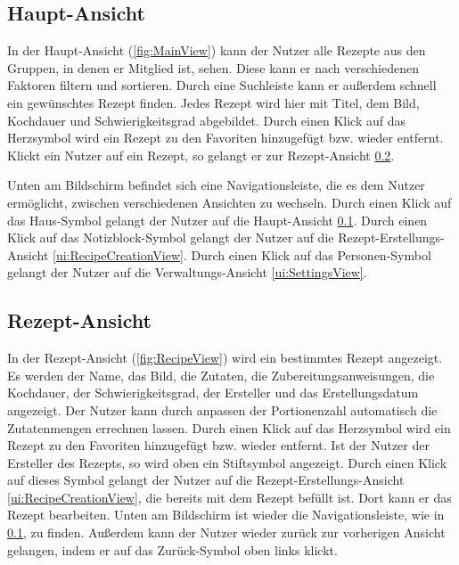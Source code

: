 \documentclass[parskip=full]{scrartcl}
\begin{document}
\subsection{Haupt-Ansicht}
\label{ui:MainView}
In der Haupt-Ansicht (\autoref{fig:MainView}) kann der Nutzer alle Rezepte aus den Gruppen, in denen er Mitglied ist, sehen. Diese kann er nach verschiedenen Faktoren filtern und sortieren. Durch eine Suchleiste kann er außerdem schnell ein gewünschtes Rezept finden. Jedes Rezept wird hier mit Titel, dem Bild, Kochdauer und Schwierigkeitsgrad abgebildet. Durch einen Klick auf das Herzsymbol wird ein Rezept zu den Favoriten hinzugefügt bzw. wieder entfernt. Klickt ein Nutzer auf ein Rezept, so gelangt er zur Rezept-Ansicht \ref{ui:RecipeView}.

Unten am Bildschirm befindet sich eine Navigationsleiste, die es dem Nutzer ermöglicht, zwischen verschiedenen Ansichten zu wechseln. Durch einen Klick auf das Haus-Symbol gelangt der Nutzer auf die Haupt-Ansicht \ref{ui:MainView}. Durch einen Klick auf das Notizblock-Symbol gelangt der Nutzer auf die Rezept-Erstellungs-Ansicht \ref{ui:RecipeCreationView}. Durch einen Klick auf das Personen-Symbol gelangt der Nutzer auf die Verwaltungs-Ansicht \ref{ui:SettingsView}.

\subsection{Rezept-Ansicht}
\label{ui:RecipeView}

In der Rezept-Ansicht (\autoref{fig:RecipeView}) wird ein bestimmtes Rezept angezeigt. Es werden der Name, das Bild, die Zutaten, die Zubereitungsanweisungen, die Kochdauer, der Schwierigkeitsgrad, der Ersteller und das Erstellungsdatum angezeigt. Der Nutzer kann durch anpassen der Portionenzahl automatisch die Zutatenmengen errechnen lassen. Durch einen Klick auf das Herzsymbol wird ein Rezept zu den Favoriten hinzugefügt bzw. wieder entfernt. Ist der Nutzer der Ersteller des Rezepts, so wird oben ein Stiftsymbol angezeigt. Durch einen Klick auf dieses Symbol gelangt der Nutzer auf die Rezept-Erstellungs-Ansicht \ref{ui:RecipeCreationView}, die bereits mit dem Rezept befüllt ist. Dort kann er das Rezept bearbeiten. Unten am Bildschirm ist wieder die Navigationsleiste, wie in \ref{ui:MainView}, zu finden. Außerdem kann der Nutzer wieder zurück zur vorherigen Ansicht gelangen, indem er auf das Zurück-Symbol oben links klickt.
\end{document}
